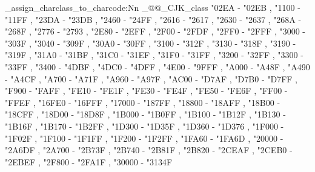 \@@_assign_charclass_to_charcode:Nn \g_@@_CJK_class
  {
    "02EA - "02EB ,
    "1100 - "11FF ,
    "23DA - "23DB ,
    "2460 - "24FF ,
    "2616 - "2617 ,
    "2630 - "2637 ,
    "268A - "268F ,
    "2776 - "2793 ,
    "2E80 - "2EFF ,
    "2F00 - "2FDF ,
    "2FF0 - "2FFF ,
    "3000 - "303F ,
    "3040 - "309F ,
    "30A0 - "30FF ,
    "3100 - "312F ,
    "3130 - "318F ,
    "3190 - "319F ,
    "31A0 - "31BF ,
    "31C0 - "31EF ,
    "31F0 - "31FF ,
    "3200 - "32FF ,
    "3300 - "33FF ,
    "3400 - "4DBF ,
    "4DC0 - "4DFF ,
    "4E00 - "9FFF ,
    "A000 - "A48F ,
    "A490 - "A4CF ,
    "A700 - "A71F ,
    "A960 - "A97F ,
    "AC00 - "D7AF ,
    "D7B0 - "D7FF ,
    "F900 - "FAFF ,
    "FE10 - "FE1F ,
    "FE30 - "FE4F ,
    "FE50 - "FE6F ,
    "FF00 - "FFEF ,
    "16FE0 - "16FFF ,
    "17000 - "187FF ,
    "18800 - "18AFF ,
    "18B00 - "18CFF ,
    "18D00 - "18D8F ,
    "1B000 - "1B0FF ,
    "1B100 - "1B12F ,
    "1B130 - "1B16F ,
    "1B170 - "1B2FF ,
    "1D300 - "1D35F ,
    "1D360 - "1D376 ,
    "1F000 - "1F02F ,
    "1F100 - "1F1FF ,
    "1F200 - "1F2FF ,
    "1FA60 - "1FA6D ,
    "20000 - "2A6DF ,
    "2A700 - "2B73F ,
    "2B740 - "2B81F ,
    "2B820 - "2CEAF ,
    "2CEB0 - "2EBEF ,
    "2F800 - "2FA1F ,
    "30000 - "3134F
  }

